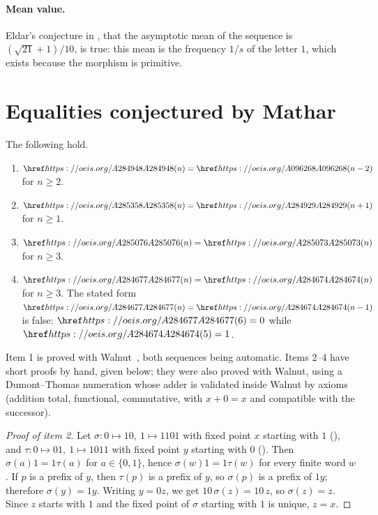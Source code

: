 \paragraph{Mean value.} Eldar's conjecture in , that the asymptotic mean of the sequence is
$(\sqrt{21}+1)/10$, is true: this mean is the frequency $1/s$ of the letter $1$, which exists because the
morphism is primitive.

\section{Equalities conjectured by Mathar}\label{s:mathar}
\begin{proposition}\label{p:mathar} The following hold.
\begin{enumerate}
\item $\oeis{A284948}(n)=\oeis{A096268}(n-2)$ for $n\ge2$.
\item $\oeis{A285358}(n)=\oeis{A284929}(n+1)$ for $n\ge1$.
\item $\oeis{A285076}(n)=\oeis{A285073}(n)$ for $n\ge3$.
\item $\oeis{A284677}(n)=\oeis{A284674}(n)$ for $n\ge3$. The stated form
  $\oeis{A284677}(n)=\oeis{A284674}(n-1)$ is false: $\oeis{A284677}(6)=0$ while $\oeis{A284674}(5)=1$.
\end{enumerate}
\end{proposition}
Item 1 is proved with Walnut~\cite{Mo,Sh}, both sequences being automatic. Items 2--4 have short proofs
by hand, given below; they were also proved with Walnut, using a Dumont--Thomas numeration whose adder
is validated inside Walnut by axioms (addition total, functional, commutative, with $x+0=x$ and compatible
with the successor).

\begin{proof}[Proof of item 2] Let $\sigma: 0\mapsto10,\ 1\mapsto1101$ with fixed point $x$ starting with $1$
(), and $\tau: 0\mapsto01,\ 1\mapsto1011$ with fixed point $y$ starting with $0$
(). Then $\sigma(a)1=1\tau(a)$ for $a\in\{0,1\}$, hence $\sigma(w)1=1\tau(w)$ for every finite
word $w$. If $p$ is a prefix of $y$, then $\tau(p)$ is a prefix of $y$, so $\sigma(p)$ is a prefix of $1y$;
therefore $\sigma(y)=1y$. Writing $y=0z$, we get $10\,\sigma(z)=10\,z$, so $\sigma(z)=z$. Since $z$ starts
with $1$ and the fixed point of $\sigma$ starting with $1$ is unique, $z=x$. \end{proof}

